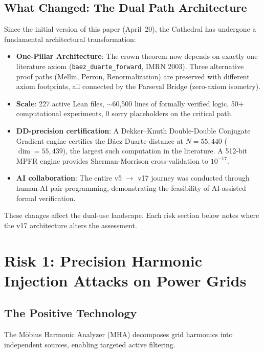 \documentclass[11pt,a4paper]{article}
\begin{document}
\subsection{What Changed: The Dual Path Architecture}

Since the initial version of this paper (April~20), the Cathedral
has undergone a fundamental architectural transformation:

\begin{itemize}
  \item \textbf{One-Pillar Architecture}: The crown theorem now depends
    on exactly one literature axiom (\texttt{baez\_duarte\_forward},
    IMRN 2003). Three alternative proof paths (Mellin, Perron,
    Renormalization) are preserved with different axiom footprints,
    all connected by the Parseval Bridge (zero-axiom isometry).
  \item \textbf{Scale}: 227 active Lean files, $\sim$60{,}500 lines of
    formally verified logic, 50+ computational experiments,
    0 sorry placeholders on the critical path.
  \item \textbf{DD-precision certification}: A Dekker--Knuth
    Double-Double Conjugate Gradient engine certifies the
    B\'aez-Duarte distance at $N = 55{,}440$ ($\dim = 55{,}439$),
    the largest such computation in the literature. A 512-bit MPFR
    engine provides Sherman-Morrison cross-validation to $10^{-17}$.
  \item \textbf{AI collaboration}: The entire v5 $\to$ v17 journey
    was conducted through human-AI pair programming, demonstrating
    the feasibility of AI-assisted formal verification.
\end{itemize}

These changes affect the dual-use landscape. Each risk section
below notes where the v17 architecture alters the assessment.

\section{Risk 1: Precision Harmonic Injection Attacks on Power Grids}
\label{sec:harmonics}

\subsection{The Positive Technology}

The M\"obius Harmonic Analyzer (MHA) decomposes grid harmonics into
independent sources, enabling targeted active filtering.
\end{document}
